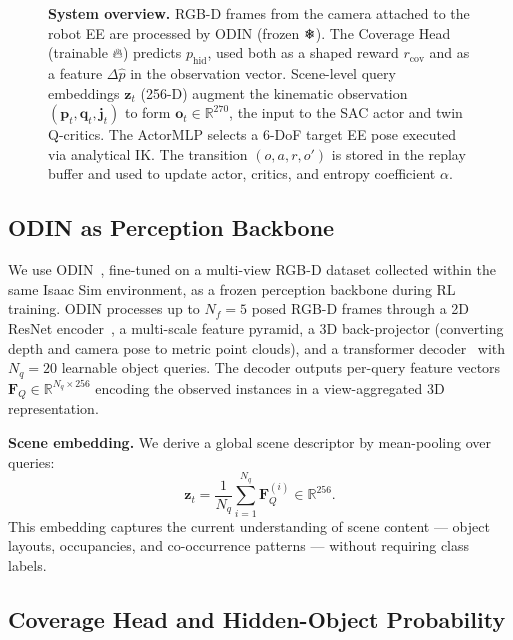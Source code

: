 \documentclass{article}
\newcommand{\phid}{p_{\text{hid}}}
\begin{document}
\begin{figure}[t]
  \centering
  
  \caption{\textbf{System overview.} RGB-D frames from the camera attached to the robot EE are processed by ODIN (frozen ❄). The Coverage Head (trainable 🔥) predicts $\phid$, used both as a shaped reward $r_\text{cov}$ and as a feature $\Delta\hat{p}$ in the observation vector. Scene-level query embeddings $\mathbf{z}_t$ (256-D) augment the kinematic observation $(\mathbf{p}_t,\mathbf{q}_t,\mathbf{j}_t)$ to form $\mathbf{o}_t\!\in\!\mathbb{R}^{270}$, the input to the SAC actor and twin Q-critics. The ActorMLP selects a 6-DoF target EE pose executed via analytical IK. The transition $(o,a,r,o')$ is stored in the replay buffer and used to update actor, critics, and entropy coefficient $\alpha$.}
  \label{fig:system}
\end{figure}

\subsection{ODIN as Perception Backbone}
\label{sec:odin}

We use ODIN~\citep{odin2024}, fine-tuned on a multi-view RGB-D dataset collected within the same Isaac Sim environment, as a frozen perception backbone during RL training. ODIN processes up to $N_f = 5$ posed RGB-D frames through a 2D ResNet encoder~\citep{he2016resnet}, a multi-scale feature pyramid, a 3D back-projector (converting depth and camera pose to metric point clouds), and a transformer decoder~\citep{vaswani2017attention} with $N_q = 20$ learnable object queries. The decoder outputs per-query feature vectors $\mathbf{F}_Q \in \mathbb{R}^{N_q \times 256}$ encoding the observed instances in a view-aggregated 3D representation.

\textbf{Scene embedding.} We derive a global scene descriptor by mean-pooling over queries:
\begin{equation}
  \mathbf{z}_t = \frac{1}{N_q}\sum_{i=1}^{N_q} \mathbf{F}_Q^{(i)} \in \mathbb{R}^{256}.
  \label{eq:scene_emb}
\end{equation}
This embedding captures the current understanding of scene content --- object layouts, occupancies, and co-occurrence patterns --- without requiring class labels.

\subsection{Coverage Head and Hidden-Object Probability}
\label{sec:coverage}
\end{document}
